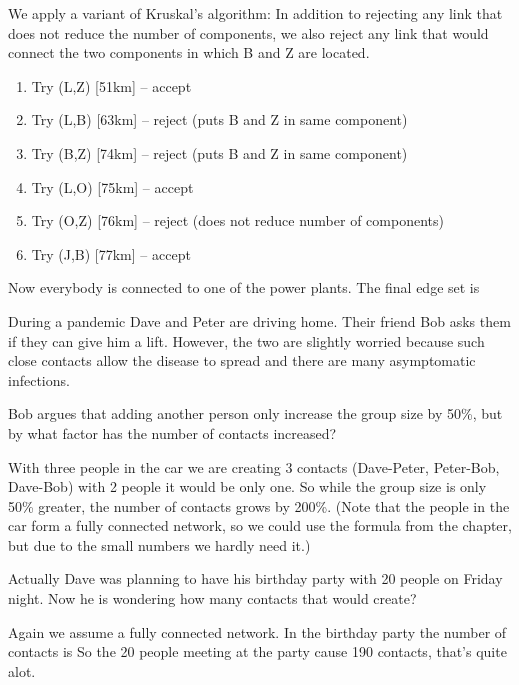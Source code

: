 
\solution
We apply a variant of Kruskal's algorithm: In addition to rejecting any link that does not reduce the number of components, we also reject any link that would connect the two components in which B and Z are located.
\begin{enumerate}
\item Try (L,Z) [51km] -- accept
\item Try (L,B) [63km] -- reject (puts B and Z in same component)
\item Try (B,Z) [74km] -- reject (puts B and Z in same component)
\item Try (L,O) [75km] -- accept
\item Try (O,Z) [76km] -- reject (does not reduce number of components)
\item Try (J,B) [77km] -- accept
\end{enumerate}
Now everybody is connected to one of the power plants. The final edge set is 



During a pandemic Dave and Peter are driving home. Their friend Bob asks them if they can give him a lift. However, the two are slightly worried because such close contacts allow the disease to spread and there are many asymptomatic infections. 

\subquestion
Bob argues that adding another person only increase the group size by 50\%, but by what factor has the number of contacts increased?

\solution
With three people in the car we are creating 3 contacts (Dave-Peter, Peter-Bob, Dave-Bob) with 2 people it would be only one. So while the group size is only 50\% greater, the number of contacts grows by 200\%. (Note that the people in the car form a fully connected network, so we could use the formula from the chapter, but due to the small numbers we hardly need it.)

\subquestion
Actually Dave was planning to have his birthday party with 20 people on Friday night. Now he is wondering how many contacts that would create?

\solution
Again we assume a fully connected network. In the birthday party the number of contacts is 
So the 20 people meeting at the party cause 190 contacts, that's quite alot.




